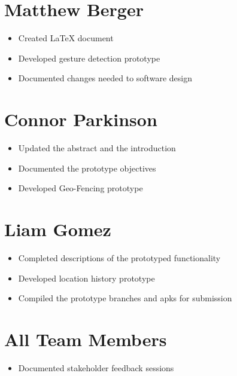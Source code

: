 \documentclass{scrreprt}
\begin{document}
	\section{Matthew Berger}
		\begin{itemize}
			\item Created LaTeX document
			\item Developed gesture detection prototype
			\item Documented changes needed to software design
		\end{itemize}
	\section{Connor Parkinson}
		\begin{itemize}
			\item Updated the abstract and the introduction
			\item Documented the prototype objectives
			\item Developed Geo-Fencing prototype
		\end{itemize}
	\section{Liam Gomez}
		\begin{itemize}
			\item Completed descriptions of the prototyped functionality
			\item Developed location history prototype
			\item Compiled the prototype branches and apks for submission
		\end{itemize}
	\section{All Team Members}
		\begin{itemize}
			\item Documented stakeholder feedback sessions
		\end{itemize}
\end{document}
